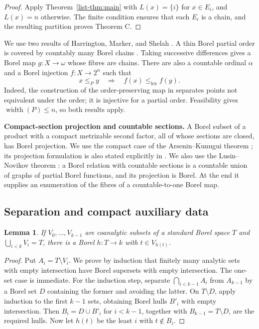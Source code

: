\documentclass[11pt,reqno]{amsart}
\theoremstyle{plain}
\newtheorem{lemma}[theorem]{Lemma}
\theoremstyle{definition}
\theoremstyle{remark}
\newcommand{\wdt}{\operatorname{width}}
\newcommand{\lex}{\mathrm{lex}}
\begin{document}
\begin{proof}
Apply Theorem~\ref{list-thm:main} with $L(x)=\{i\}$ for $x\in E_i$, and
$L(x)=n$ otherwise. The finite condition ensures that each $E_i$
is a chain, and the resulting partition proves Theorem C.
\end{proof}

We use two results of Harrington, Marker, and Shelah
\cite{HarringtonMarkerShelah1988}. A thin Borel partial order is covered
by countably many Borel chains \cite[Theorem~5.1]{HarringtonMarkerShelah1988}.
Taking successive differences gives a Borel map $g:X\to\omega$ whose
fibres are chains. There are also a countable ordinal $\alpha$ and a
Borel injection $f:X\to2^\alpha$ such that
\begin{equation}\label{list-eq:hms}
x\le_P y\quad\Longrightarrow\quad f(x)\le_{\lex}f(y).
\end{equation}
Indeed, the construction of the order-preserving map in
\cite[Theorem~3.1 and its proof]{HarringtonMarkerShelah1988} separates
points not equivalent under the order; it is injective for a partial
order. Feasibility gives $\wdt(P)\le n$, so both results apply.

\smallskip
\noindent\textbf{Compact-section projection and countable sections.}
A Borel subset of a product with a compact metrizable second factor,
all of whose sections are closed, has Borel projection. We use the
compact case of the Arsenin--Kunugui theorem
\cite[Theorem~35.46]{Kechris1995}; its projection formulation is also stated
explicitly in \cite[pp.~191, 193]{HolickyZeleny2000}. We also use the Lusin--Novikov theorem
\cite[Theorem~18.10]{Kechris1995}: a Borel relation with countable sections is
a countable union of graphs of partial Borel functions, and its projection
is Borel. At the end it supplies an enumeration of the fibres of a
countable-to-one Borel map.

\subsection{Separation and compact auxiliary data}

\begin{lemma}\label{list-lem:finite-cover}
If $V_0,\ldots,V_{k-1}$ are coanalytic subsets of a standard Borel space $T$
and $\bigcup_{i<k}V_i=T$, there is a Borel $h:T\to k$ with $t\in V_{h(t)}$.
\end{lemma}

\begin{proof}
Put $A_i=T\setminus V_i$. We prove by induction that finitely many analytic
sets with empty intersection have Borel supersets with empty intersection.
The one-set case is immediate. For the induction step, separate
$\bigcap_{i<k-1}A_i$ from $A_{k-1}$ by a Borel set $D$ containing the former
and avoiding the latter. On $T\setminus D$, apply induction to the first
$k-1$ sets, obtaining Borel hulls $B'_i$ with empty intersection. Then
$B_i=D\cup B'_i$ for $i<k-1$, together with $B_{k-1}=T\setminus D$, are the
required hulls. Now let $h(t)$ be the least $i$ with $t\notin B_i$.
\end{proof}
\end{document}
